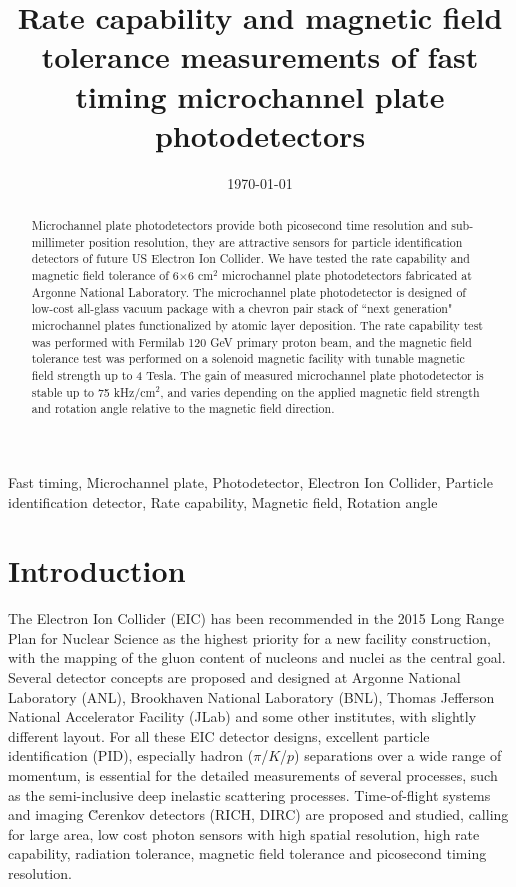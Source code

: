 \documentclass[preprint,5p]{elsarticle}
\title{\vspace{-15mm}\fontsize{24pt}{10pt}\selectfont\textbf{Rate capability 
and magnetic field tolerance measurements of fast timing microchannel plate 
photodetectors}}
\date{\today}
\begin{document}
\begin{abstract}
Microchannel plate photodetectors provide both picosecond time resolution and 
sub-millimeter position resolution, they are attractive sensors for particle 
identification detectors of future US Electron Ion Collider. We have tested the 
rate capability and magnetic field tolerance of 6$\times$6 cm$^{2}$ 
microchannel plate photodetectors fabricated at Argonne National Laboratory.  
The microchannel plate photodetector is designed of low-cost all-glass vacuum 
package with a chevron pair stack of ``next generation" microchannel plates 
functionalized by atomic layer deposition. The rate capability test was 
performed with Fermilab 120 GeV primary proton beam, and the magnetic field 
tolerance test was performed on a solenoid magnetic facility with tunable 
magnetic field strength up to 4 Tesla. The gain of measured microchannel plate 
photodetector is stable up to 75 kHz/cm$^{2}$, and varies depending on the 
applied magnetic field strength and rotation angle relative to the magnetic 
field direction.
\end{abstract}

\maketitle

\begin{keywords}
   Fast timing, Microchannel plate, Photodetector, Electron Ion Collider, 
   Particle identification detector, Rate capability, Magnetic field, Rotation 
   angle
\end{keywords}


\section{Introduction} \label{sec:level1}
The Electron Ion Collider (EIC) \cite{EIC} has been recommended in the 2015 
Long Range Plan for Nuclear Science \cite{LRP} as the highest priority for a 
new facility construction, with the mapping of the gluon content of nucleons 
and nuclei as the central goal. Several detector concepts are proposed and 
designed at Argonne National Laboratory (ANL), Brookhaven National Laboratory 
(BNL), Thomas Jefferson National Accelerator Facility (JLab) and some other 
institutes, with slightly different layout. For all these EIC detector designs, 
excellent particle identification (PID), especially hadron ($\pi$/$K$/$p$) 
separations over a wide range of momentum, is essential for the detailed 
measurements of several processes, such as the semi-inclusive deep inelastic 
scattering processes. Time-of-flight systems and imaging \u Cerenkov detectors 
(RICH, DIRC) \cite{RICH,RICH2,DRIC} are proposed and studied, calling for large 
area, low cost photon sensors with high spatial resolution, high rate 
capability, radiation tolerance, magnetic field tolerance and picosecond timing 
resolution. 
\end{document}
